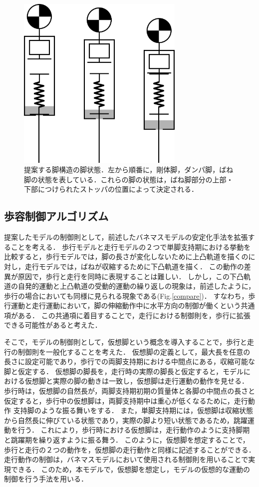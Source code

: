 \begin{figure}[htbp]
 \centering
 \includegraphics[clip,width=8.0cm]{./fig/leg_concept.png}
    \caption{提案する脚構造の脚状態．左から順番に，剛体脚，ダンパ脚，ばね脚の状態を表している．これらの脚の状態は，ばね脚部分の上部・下部につけられたストッパの位置によって決定される．\label{proposed_model}}
\end{figure}



\subsection{歩容制御アルゴリズム}
提案したモデルの制御則として，前述したバネマスモデルの安定化手法を拡張することを考える．
歩行モデルと走行モデルの２つで単脚支持期における挙動を比較すると，歩行モデルでは，脚の長さが変化しないために上凸軌道を描くのに対し，走行モデルでは，ばねが収縮するために下凸軌道を描く．
この動作の差異が原因で，歩行と走行を同時に表現することは難しい．
しかし，この下凸軌道の自発的運動と上凸軌道の受動的運動の繰り返しの現象は，前述したように，歩行の場合においても同様に見られる現象である(Fig.\ref{compare})．
すなわち，歩行運動と走行運動において，脚の伸縮動作中に水平方向の制御が働くという共通項がある．
この共通項に着目することで，走行における制御則を，歩行に拡張できる可能性があると考えた．

そこで，モデルの制御則として，仮想脚という概念を導入することで，歩行と走行の制御則を一般化することを考えた．
仮想脚の定義として，最大長を任意の長さに設定可能であり，歩行での両脚支持期における中間点にある，収縮可能な脚と仮定する．
仮想脚の脚長を，走行時の実際の脚長と仮定すると，モデルにおける仮想脚と実際の脚の動きは一致し，仮想脚は走行運動の動作を見せる．
歩行時は，仮想脚の自然長が，両脚支持期初期の質量体と各脚の中間点の長さと仮定すると，歩行中の仮想脚は，両脚支持期中は重心が低くなるために，走行動作
支持脚のような振る舞いをする．
また，単脚支持期には，仮想脚は収縮状態から自然長に伸びている状態であり，実際の脚より短い状態であるため，跳躍運動を行う．
これにより，歩行時における仮想脚は，走行動作のように支持脚期と跳躍期を繰り返すように振る舞う．
このように，仮想脚を想定することで，歩行と走行の２つの動作を，仮想脚の走行動作と同様に記述することができる．
走行動作の制御は，バネマスモデルにおいて使用される制御則を用いることで実現できる．
このため，本モデルで，仮想脚を想定し，モデルの仮想的な運動の制御を行う手法を用いる．

